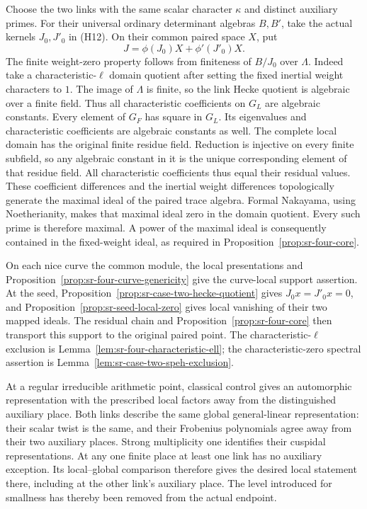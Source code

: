 Choose the two links with the same scalar character
\(\kappa\) and distinct auxiliary primes.
For their universal ordinary determinant algebras
\(B,B'\), take the actual kernels \(J_0,J'_0\)
in (H12). On their common paired space \(X\), put
\[
                        J=\phi(J_0)X+\phi'(J'_0)X.
 \tag{H16}
\]
The finite weight-zero property follows from
finiteness of \(B/J_0\) over \(\Lambda\).
Indeed take a characteristic-\(\ell\) domain
quotient after setting the fixed inertial weight
characters to \(1\).
The image of \(\Lambda\) is finite, so the link
Hecke quotient is algebraic over a finite field.
Thus all characteristic coefficients on \(G_L\)
are algebraic constants.
Every element of \(G_F\) has square in \(G_L\).
Its eigenvalues and characteristic coefficients
are algebraic constants as well.
The complete local domain has the original finite
residue field. Reduction is injective on every finite
subfield, so any algebraic constant in it is the unique
corresponding element of that residue field.
All characteristic coefficients thus equal their
residual values.
These coefficient differences and the inertial weight
differences topologically generate the maximal ideal
of the paired trace algebra. Formal Nakayama, using
Noetherianity, makes that maximal ideal zero in the
domain quotient. Every such prime is therefore maximal.
A power of the maximal ideal is consequently contained
in the fixed-weight ideal, as required in
Proposition~\ref{prop:sr-four-core}.

On each nice curve the common module, the local
presentations and
Proposition~\ref{prop:sr-four-curve-genericity}
give the curve-local support assertion.
At the seed,
Proposition~\ref{prop:sr-case-two-hecke-quotient}
gives \(J_0x=J'_0x=0\), and
Proposition~\ref{prop:sr-seed-local-zero}
gives local vanishing of their two mapped ideals.
The residual chain and
Proposition~\ref{prop:sr-four-core} then transport
this support to the original paired point.
The characteristic-\(\ell\) exclusion is
Lemma~\ref{lem:sr-four-characteristic-ell};
the characteristic-zero spectral assertion is
Lemma~\ref{lem:sr-case-two-speh-exclusion}.

At a regular irreducible arithmetic point, classical
control gives an automorphic representation with
the prescribed local factors away from the
distinguished auxiliary place.
Both links describe the same global general-linear
representation: their scalar twist is the same,
and their Frobenius polynomials agree away from
their two auxiliary places.
Strong multiplicity one identifies their cuspidal
representations. At any one finite place at
least one link has no auxiliary exception.
Its local--global comparison therefore gives
the desired local statement there, including
at the other link's auxiliary place.
The level introduced for smallness has thereby
been removed from the actual endpoint.

